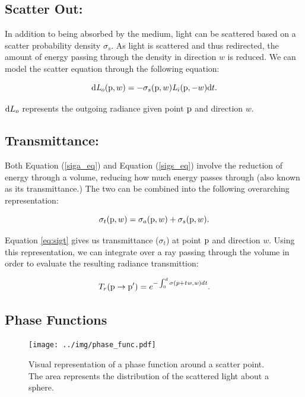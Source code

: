 \subsection{Scatter Out:}
In addition to being absorbed by the medium, light can be scattered based on a scatter probability density $\sigma_{s}$.  As light is scattered and thus redirected, the amount of energy passing through the density in direction $w$ is reduced.  We can model the scatter equation through the following equation:

\begin{equation}
\textup{d}\mathit{L}_{o}(\textup{p},w) = -\sigma_{s}(\textup{p},w) \mathit{L}_{i}(\textup{p},-w)\textup{d}t.
\label{sigs_eq}
\end{equation}

$\textup{d}L_{o}$ represents the outgoing radiance given point $\textup{p}$ and direction $w$.

\subsection{Transmittance:}
Both Equation (\ref{siga_eq}) and Equation (\ref{sigs_eq}) involve the reduction of energy through a volume, reducing how much energy passes through (also known as its transmittance.)  The two can be combined into the following overarching representation:

\begin{equation}
\sigma_{t}(\textup{p},w) = \sigma_{a}(\textup{p},w) + \sigma_{s}(\textup{p}, w).
\label{eq:sigt}
\end{equation}

Equation \ref{eq:sigt} gives us transmittance ($\sigma_{t}$) at point $\textup{p}$ and direction $w$.  Using this representation, we can integrate over a ray passing through the volume in order to evaluate the resulting radiance transmittion:

\begin{equation}
T_{r}(\textup{p} \to \textup{p}') = e^{-\int_{0}^{d}\sigma (p+t\mathit{w},\mathit{w})d\mathit{t}}.
\label{transmittion_eq}
\end{equation}

\subsection{Phase Functions}

\begin{figure}[h!]
    \centering
    \texttt{[image: ../img/phase\_func.pdf]}
    \captionfonts
    \caption{Visual representation of a phase function around a scatter point.  The area represents the distribution of the scattered light about a sphere.}
    \label{fig:phase}
\end{figure}

